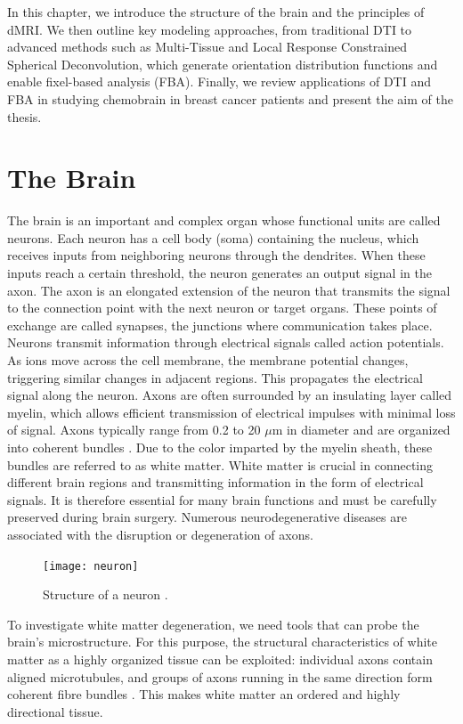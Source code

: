 In this chapter, we introduce the structure of the brain and the principles of dMRI. We then outline key modeling approaches, from traditional DTI to advanced methods such as Multi-Tissue and Local Response Constrained Spherical Deconvolution, which generate orientation distribution functions and enable fixel-based analysis (FBA). Finally, we review applications of DTI and FBA in studying chemobrain in breast cancer patients and present the aim of the thesis.

\section{The Brain}
The brain is an important and complex organ whose functional units are called neurons. Each neuron has a cell body (soma) containing the nucleus, which receives inputs from neighboring neurons through the dendrites. When these inputs reach a certain threshold, the neuron generates an output signal in the axon. The axon is an elongated extension of the neuron that transmits the signal to the connection point with the next neuron or target organs. These points of exchange are called synapses, the junctions where communication takes place. Neurons transmit information through electrical signals called action potentials. As ions move across the cell membrane, the membrane potential changes, triggering similar changes in adjacent regions. This propagates the electrical signal along the neuron. Axons are often surrounded by an insulating layer called myelin, which allows efficient transmission of electrical impulses with minimal loss of signal. Axons typically range from 0.2 to 20 $\mu$m in diameter and are organized into coherent bundles \cite{Edgar2013}. Due to the color imparted by the myelin sheath, these bundles are referred to as white matter. White matter is crucial in connecting different brain regions and transmitting information in the form of electrical signals. It is therefore essential for many brain functions and must be carefully preserved during brain surgery. Numerous neurodegenerative diseases are associated with the disruption or degeneration of axons.

\begin{figure}[h]
  \centering
  \texttt{[image: neuron]} %
  \caption{Structure of a neuron \cite{Bond2022}.}
  \label{fig:neuron}
\end{figure}

To investigate white matter degeneration, we need tools that can probe the brain's microstructure. For this purpose, the structural characteristics of white matter as a highly organized tissue can be exploited: individual axons contain aligned microtubules, and groups of axons running in the same direction form coherent fibre bundles \cite{Assaf2013}. This makes white matter an ordered and highly directional tissue.

